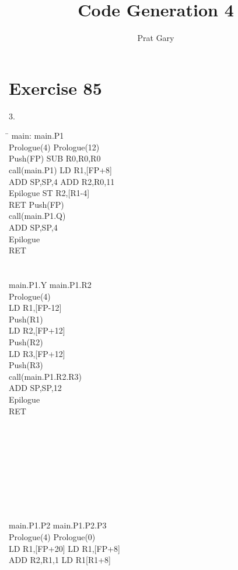 \documentclass[10pt,a4paper]{article}
\author{Prat Gary}
\title{Code  Generation 4}
\begin{document}
\maketitle
\section{Exercise 85}
3.\\
\begin{tabbing}
\hspace{8cm}\=\kill
main: \> main.P1\\
Prologue(4) \> Prologue(12)\\
Push(FP) \> SUB R0,R0,R0\\
call(main.P1)\> LD R1,[FP+8] \\
ADD SP,SP,4\> ADD R2,R0,11\\
Epilogue\> ST R2,[R1-4]\\
RET\> Push(FP)\\
\> call(main.P1.Q)\\
\> ADD SP,SP,4\\
\> Epilogue\\
\> RET\\
\\
\\
main.P1.Y\> main.P1.R2\\
\> Prologue(4)\\
\> LD R1,[FP-12]\\
\> Push(R1)\\
\> LD R2,[FP+12]\\
\> Push(R2)\\
\> LD R3,[FP+12]\\
\> Push(R3)\\
\> call(main.P1.R2.R3)\\
\> ADD SP,SP,12\\
\> Epilogue\\
\> RET\\
\\
\\
\\
\\
\\
\\
\\
\\
\\
main.P1.P2\> main.P1.P2.P3\\
Prologue(4)\> Prologue(0) \\
LD R1,[FP+20]\> LD R1,[FP+8]\\
ADD R2,R1,1\> LD R1[R1+8]\\

\end{tabbing}
\end{document}
